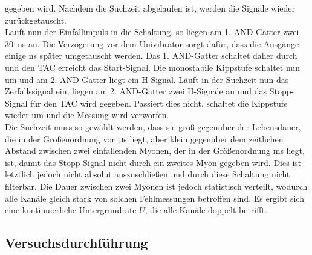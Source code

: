 \documentclass[
  bibliography=totoc,     %
  captions=tableheading,  %
  titlepage=firstiscover, %
]{scrartcl}
\begin{document}
  gegeben wird. Nachdem die Suchzeit abgelaufen ist, werden die Signale wieder zurückgetauscht.\\
  Läuft nun der Einfallimpuls in die Schaltung, so liegen am 1. AND-Gatter zwei
  \SI{30}{\nano\second} an. Die Verzögerung vor dem Univibrator sorgt dafür, dass die Ausgänge einige
  \si{\nano\second} später umgetauscht werden. Das 1. AND-Gatter schaltet daher durch
  und den TAC erreicht das Start-Signal. Die monostabile Kippstufe schaltet nun um
  und am 2. AND-Gatter liegt ein H-Signal. Läuft in der Suchzeit nun das Zerfallssignal
  ein, liegen am 2. AND-Gatter zwei H-Signale an und das Stopp-Signal für den TAC wird gegeben.
  Passiert dies nicht, schaltet die Kippstufe wieder um und die Messung wird verworfen.\\
  Die Suchzeit muss so gewählt werden, dass sie groß gegenüber der Lebensdauer, die in der Größenordnung
  von \si{\micro\second} liegt, aber klein
  gegenüber dem zeitlichen Abstand zwischen zwei einfallenden Myonen, der in der
  Größenordnung \si{\milli\second} liegt, ist, damit das
  Stopp-Signal nicht durch ein zweites Myon gegeben wird. Dies ist letztlich jedoch nicht absolut
  auszuschließen und durch diese Schaltung nicht filterbar. Die Dauer zwischen
  zwei Myonen ist jedoch statistisch verteilt, wodurch alle Kanäle gleich stark von
  solchen Fehlmessungen betroffen sind. Es ergibt sich eine kontinuierliche Untergrundrate $U$,
  die alle Kanäle doppelt betrifft.
  \subsection{Versuchsdurchführung}
  \label{sec:Durchführung}
\end{document}
